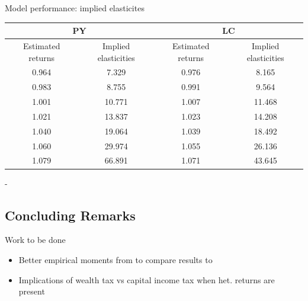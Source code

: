 \documentclass{beamer}
\begin{document}

\begin{frame}{Model performance: implied elasticites}

  \begin{center}
\begin{tabular}{|c|c|c|c|}
\hline
\multicolumn{2}{|c|}{PY} & \multicolumn{2}{|c|}{LC} \\
\hline
Estimated returns & Implied elasticities & Estimated returns & Implied elasticities \\
\hline
0.964 & 7.329 & 0.976 & 8.165 \\
0.983 & 8.755 & 0.991 & 9.564 \\
1.001 & 10.771 & 1.007 & 11.468 \\
1.021 & 13.837 & 1.023 & 14.208 \\
1.040 & 19.064 & 1.039 & 18.492 \\
1.060 & 29.974 & 1.055 & 26.136 \\
1.079 & 66.891 & 1.071 & 43.645 \\
\hline
\end{tabular}
\end{center}

\vspace{2.5mm}
\cite{Genay2004} - 

\end{frame}





\subsection{Concluding Remarks}


\begin{frame}{Work to be done}
  \begin{itemize}
\item Better empirical moments from \cite{aflgdmlp20} to compare results to
\item Implications of wealth tax vs capital income tax when het. returns are present \cite{Guvenen2023}
\end{itemize}
\end{frame}


\end{document}
